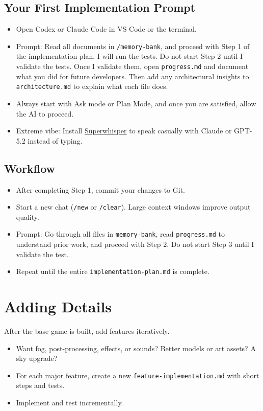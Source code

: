\documentclass[12pt]{article}
\begin{document}
\subsection{Your First Implementation Prompt}
\begin{itemize}
  \item Open Codex or Claude Code in VS Code or the terminal.
  \item Prompt: Read all documents in \texttt{/memory-bank}, and proceed with Step 1 of the implementation plan. I will run the tests. Do not start Step 2 until I validate the tests. Once I validate them, open \texttt{progress.md} and document what you did for future developers. Then add any architectural insights to \texttt{architecture.md} to explain what each file does.
  \item Always start with Ask mode or Plan Mode, and once you are satisfied, allow the AI to proceed.
  \item Extreme vibe: Install \href{https://superwhisper.com}{Superwhisper} to speak casually with Claude or GPT-5.2 instead of typing.
\end{itemize}

\subsection{Workflow}
\begin{itemize}
  \item After completing Step 1, commit your changes to Git.
  \item Start a new chat (\texttt{/new} or \texttt{/clear}). Large context windows improve output quality.
  \item Prompt: Go through all files in \texttt{memory-bank}, read \texttt{progress.md} to understand prior work, and proceed with Step 2. Do not start Step 3 until I validate the test.
  \item Repeat until the entire \texttt{implementation-plan.md} is complete.
\end{itemize}

\section{Adding Details}
After the base game is built, add features iteratively.
\begin{itemize}
  \item Want fog, post-processing, effects, or sounds? Better models or art assets? A sky upgrade?
  \item For each major feature, create a new \texttt{feature-implementation.md} with short steps and tests.
  \item Implement and test incrementally.
\end{itemize}
\end{document}
